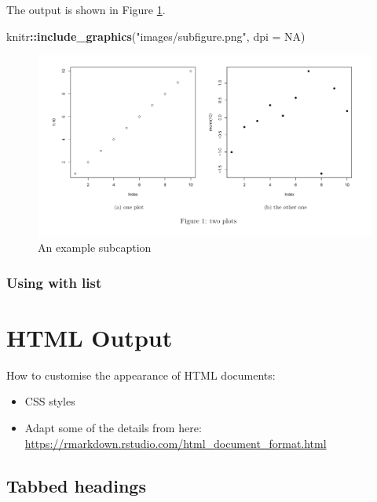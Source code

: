 \documentclass[]{book}
\newenvironment{Shaded}{\begin{snugshade}}{\end{snugshade}}
\newcommand{\KeywordTok}[1]{\textcolor[rgb]{0.13,0.29,0.53}{\textbf{#1}}}
\newcommand{\DataTypeTok}[1]{\textcolor[rgb]{0.13,0.29,0.53}{#1}}
\newcommand{\StringTok}[1]{\textcolor[rgb]{0.31,0.60,0.02}{#1}}
\newcommand{\OtherTok}[1]{\textcolor[rgb]{0.56,0.35,0.01}{#1}}
\newcommand{\OperatorTok}[1]{\textcolor[rgb]{0.81,0.36,0.00}{\textbf{#1}}}
\newcommand{\NormalTok}[1]{#1}
\providecommand{\tightlist}{%
  \setlength{\itemsep}{0pt}\setlength{\parskip}{0pt}}
\begin{document}
The output is shown in Figure \ref{fig:subcaptions}.

\begin{Shaded}
\begin{Highlighting}[]
\NormalTok{knitr}\OperatorTok{::}\KeywordTok{include_graphics}\NormalTok{(}\StringTok{"images/subfigure.png"}\NormalTok{, }\DataTypeTok{dpi =} \OtherTok{NA}\NormalTok{)}
\end{Highlighting}
\end{Shaded}

\begin{figure}
\centering
\includegraphics{images/subfigure.png}
\caption{\label{fig:subcaptions}An example subcaption}
\end{figure}

\subsection{Using with list}\label{using-with-list}

\chapter{HTML Output}\label{html-output}

How to customise the appearance of HTML documents:

\begin{itemize}
\tightlist
\item
  CSS styles
\item
  Adapt some of the details from here:
  \url{https://rmarkdown.rstudio.com/html_document_format.html}
\end{itemize}

\section{Tabbed headings}\label{tabbed-headings}
\end{document}
